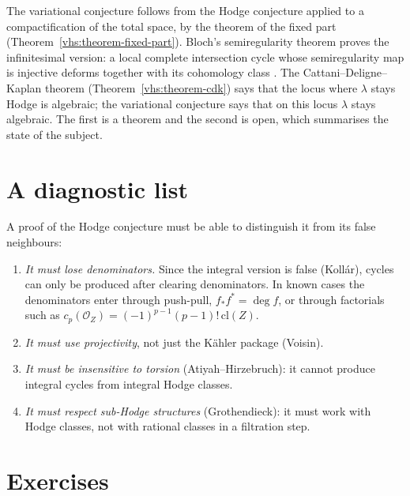 \begin{remark}\label{failures:remark-variational}
The variational conjecture follows from the Hodge conjecture applied to a compactification of the total space, by the theorem of the fixed part (Theorem~\ref{vhs:theorem-fixed-part}). Bloch's
semiregularity theorem proves the infinitesimal version: a local complete intersection cycle whose semiregularity map is injective deforms together with its cohomology class
\cite{bloch-1972}. The Cattani--Deligne--Kaplan theorem (Theorem~\ref{vhs:theorem-cdk}) says that the locus where $\lambda$ stays Hodge is algebraic; the variational conjecture says that on this locus
$\lambda$ stays algebraic. The first is a theorem and the second is open, which summarises the state of the subject.
\end{remark}

\section{A diagnostic list}\label{failures:section-diagnostic}

\begin{remark}\label{failures:remark-diagnostic}
A proof of the Hodge conjecture must be able to distinguish it from its false neighbours:
\begin{enumerate}
\item \emph{It must lose denominators.} Since the integral version is false (Koll\'ar), cycles can only be produced after clearing denominators. In known cases the denominators enter through
push-pull, $f_*f^* = \deg f$, or through factorials such as $c_p(\mathcal{O}_Z) = (-1)^{p-1}(p-1)!\,\mathrm{cl}(Z)$.
\item \emph{It must use projectivity}, not just the K\"ahler package (Voisin).
\item \emph{It must be insensitive to torsion} (Atiyah--Hirzebruch): it cannot produce integral cycles from integral Hodge classes.
\item \emph{It must respect sub-Hodge structures} (Grothendieck): it must work with Hodge classes, not with rational classes in a filtration step.
\end{enumerate}
\end{remark}

\section{Exercises}\label{failures:section-exercises}

